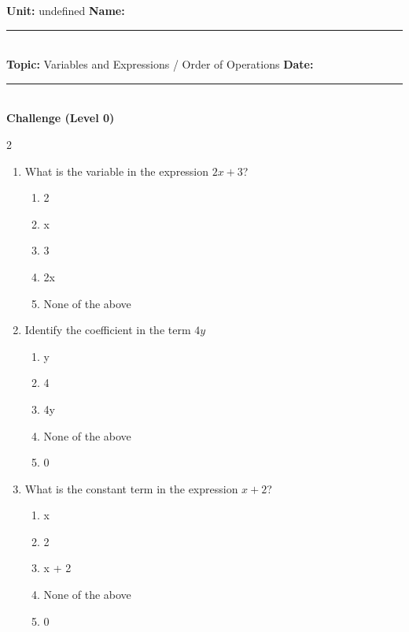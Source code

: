 \documentclass[10pt]{article}
\begin{document}
\enlargethispage{2.5cm}

\begin{tcolorbox}[colback=mainblue!5, colframe=mainblue, sharp corners, boxrule=0.5pt]
    \small \textbf{Unit:} undefined \hfill \textbf{Name:} \rule{3cm}{0.4pt} \\
    \small \textbf{Topic:} Variables and Expressions / Order of Operations \hfill \textbf{Date:} \rule{2cm}{0.4pt} \\
    \centering \textbf{\large Challenge (Level 0)}
\end{tcolorbox}

\vspace{0.2cm}

\begin{multicols}{2}
\begin{enumerate}[label=\textbf{Q\arabic*.}, leftmargin=*, itemsep=6pt, parsep=0pt]

  \item \small What is the variable in the expression $2x + 3$?
  \begin{enumerate}[label=(\Alph*), leftmargin=0.6cm, nosep, itemsep=2pt]
    \item 2
    \item x
    \item 3
    \item 2x
    \item None of the above
  \end{enumerate}

  \item \small Identify the coefficient in the term $4y$
  \begin{enumerate}[label=(\Alph*), leftmargin=0.6cm, nosep, itemsep=2pt]
    \item y
    \item 4
    \item 4y
    \item None of the above
    \item 0
  \end{enumerate}

  \item \small What is the constant term in the expression $x + 2$?
  \begin{enumerate}[label=(\Alph*), leftmargin=0.6cm, nosep, itemsep=2pt]
    \item x
    \item 2
    \item x + 2
    \item None of the above
    \item 0
  \end{enumerate}


\end{enumerate}
\end{multicols}
\end{document}
